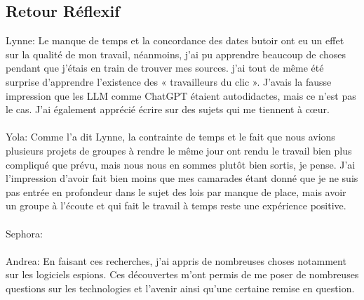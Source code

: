 \documentclass{article}
\begin{document}
\subsection{Retour Réflexif}
Lynne:  Le manque de temps et la concordance des dates butoir ont eu un effet sur la qualité de mon travail, néanmoins, j'ai pu apprendre beaucoup de choses pendant que j’étais en train de trouver mes sources. j’ai tout de même été surprise d'apprendre l'existence des « travailleurs du clic ». J'avais la fausse impression que les LLM comme ChatGPT étaient autodidactes, mais ce n'est pas le cas. J’ai également apprécié écrire sur des sujets qui me tiennent à cœur. \\\\
Yola: Comme l'a dit Lynne, la contrainte de temps et le fait que nous avions plusieurs projets de groupes à rendre le même jour ont rendu le travail bien plus compliqué que prévu, mais nous nous en sommes plutôt bien sortis, je pense. J'ai l'impression d'avoir fait bien moins que mes camarades étant donné que je ne suis pas entrée en profondeur dans le sujet des lois par manque de place, mais avoir un groupe à l'écoute et qui fait le travail à temps reste une expérience positive.\\\\
Sephora:  \\\\
Andrea:  En faisant ces recherches, j’ai appris de nombreuses choses notamment sur les logiciels espions. Ces découvertes m’ont permis de me poser de nombreuses questions sur les technologies et l’avenir ainsi qu’une certaine remise en question.  \\\\




\end{document}
